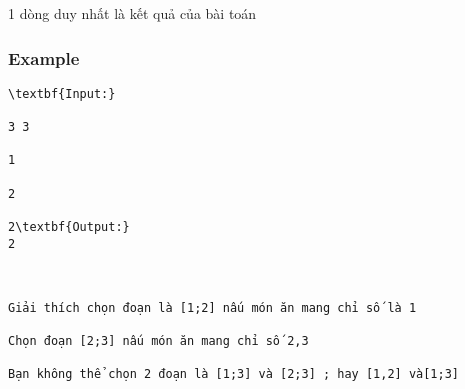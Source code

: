    1 dòng duy nhất là kết quả của bài toán  

\subsubsection{   Example  }
\begin{verbatim}
\textbf{Input:}

3 3

1

2

2\textbf{Output:}
2\end{verbatim}
\begin{verbatim}


Giải thích chọn đoạn là [1;2] nấu món ăn mang chỉ số là 1

Chọn đoạn [2;3] nấu món ăn mang chỉ số 2,3

Bạn không thể chọn 2 đoạn là [1;3] và [2;3] ; hay [1,2] và[1;3]\end{verbatim}
